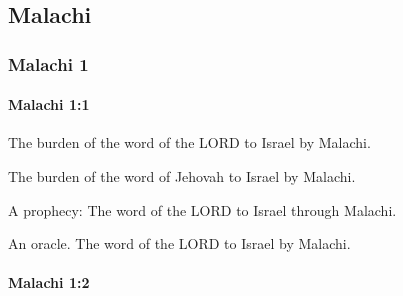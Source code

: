 \subsection{Malachi}
	\label{MALACHI}

	\subsubsection{Malachi 1} %
		\label{MALACHI-1}

		\paragraph{Malachi 1:1} %
			\label{MALACHI-1-1}

			The burden of the word of the LORD to Israel by Malachi.

			\begin{versebox}
					\item[BHS] 
					\item[LXX] 
					\item[ASV] The burden of the word of Jehovah to Israel by Malachi.
					\item[NIV] A prophecy: The word of the LORD to Israel through Malachi.
					\item[NRSV] An oracle. The word of the LORD to Israel by Malachi.
			\end{versebox}

		\paragraph{Malachi 1:2} %
			\label{MALACHI-1-2}

